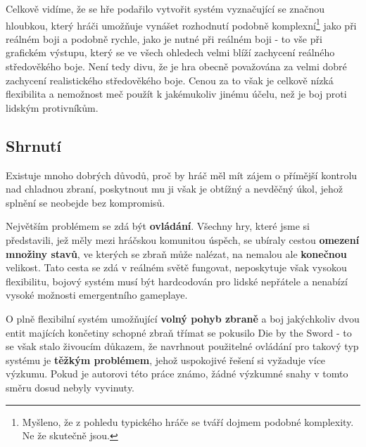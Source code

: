 Celkově vidíme, že se hře podařilo vytvořit systém vyznačující se značnou hloubkou, který hráči umožňuje vynášet rozhodnutí podobně komplexní\footnote{Myšleno, že z pohledu typického hráče se tváří dojmem podobné komplexity. Ne že skutečně jsou.} jako při reálném boji a podobně rychle, jako je nutné při reálném boji - to vše při grafickém výstupu, který se ve všech ohledech velmi blíží zachycení reálného středověkého boje. Není tedy divu, že je hra obecně považována za velmi dobré zachycení realistického středověkého boje. Cenou za to však je celkově nízká flexibilita a nemožnost meč použít k jakémukoliv jinému účelu, než je boj proti lidským protivníkům.

\subsection{Shrnutí}

Existuje mnoho dobrých důvodů, proč by hráč měl mít zájem o přímější kontrolu nad chladnou zbraní, poskytnout mu ji však je obtížný a nevděčný úkol, jehož splnění se neobejde bez kompromisů.  

Největším problémem se zdá být \textbf{ovládání}. Všechny hry, které jsme si představili, jež měly mezi hráčskou komunitou úspěch, se ubíraly cestou \textbf{omezení množiny stavů}, ve kterých se zbraň může nalézat, na nemalou ale \textbf{konečnou} velikost. Tato cesta se zdá v reálném světě fungovat, neposkytuje však vysokou flexibilitu, bojový systém musí být hardcodován pro lidské nepřátele a nenabízí vysoké možnosti emergentního gameplaye. 

O plně flexibilní systém umožňující \textbf{volný pohyb zbraně} a boj jakýchkoliv dvou entit majících končetiny schopné zbraň třímat se pokusilo Die by the Sword \cite{DieByTheSword} - to se však stalo živoucím důkazem, že navrhnout použitelné ovládání pro takový typ systému je \textbf{těžkým problémem}, jehož uspokojivé řešení si vyžaduje více výzkumu. Pokud je autorovi této práce známo, žádné výzkumné snahy v tomto směru dosud nebyly vyvinuty.




